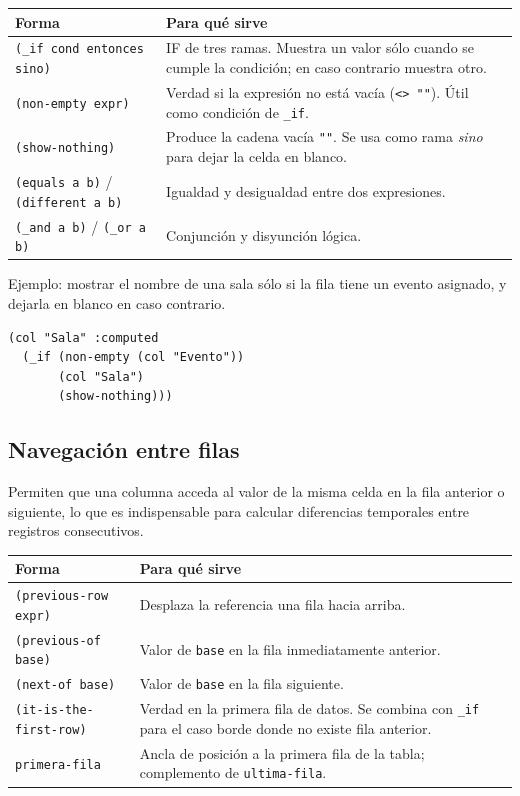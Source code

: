 \documentclass[12pt,a4paper]{report}
\begin{document}
\begin{center}
\begin{tabular}{lp{8cm}}
\toprule
\textbf{Forma} & \textbf{Para qué sirve} \\
\midrule
\texttt{(\_if cond entonces sino)} & IF de tres ramas.  Muestra un valor sólo
  cuando se cumple la condición; en caso contrario muestra otro. \\
\texttt{(non-empty expr)} & Verdad si la expresión no está vacía (\texttt{<> ""}).
  Útil como condición de \texttt{\_if}. \\
\texttt{(show-nothing)} & Produce la cadena vacía \texttt{""}.  Se usa como
  rama \emph{sino} para dejar la celda en blanco. \\
\texttt{(equals a b)} / \texttt{(different a b)} & Igualdad y desigualdad
  entre dos expresiones. \\
\texttt{(\_and a b)} / \texttt{(\_or a b)} & Conjunción y disyunción lógica. \\
\bottomrule
\end{tabular}
\end{center}

Ejemplo: mostrar el nombre de una sala sólo si la fila tiene un evento
asignado, y dejarla en blanco en caso contrario.

\begin{lstlisting}
(col "Sala" :computed
  (_if (non-empty (col "Evento"))
       (col "Sala")
       (show-nothing)))
\end{lstlisting}

\subsection*{Navegación entre filas}

Permiten que una columna acceda al valor de la misma celda en la fila
anterior o siguiente, lo que es indispensable para calcular diferencias
temporales entre registros consecutivos.

\begin{center}
\begin{tabular}{lp{8cm}}
\toprule
\textbf{Forma} & \textbf{Para qué sirve} \\
\midrule
\texttt{(previous-row expr)} & Desplaza la referencia una fila hacia arriba. \\
\texttt{(previous-of base)} & Valor de \texttt{base} en la fila inmediatamente
  anterior. \\
\texttt{(next-of base)} & Valor de \texttt{base} en la fila siguiente. \\
\texttt{(it-is-the-first-row)} & Verdad en la primera fila de datos.  Se
  combina con \texttt{\_if} para el caso borde donde no existe fila anterior. \\
\texttt{primera-fila} & Ancla de posición a la primera fila de la tabla;
  complemento de \texttt{ultima-fila}. \\
\bottomrule
\end{tabular}
\end{center}
\end{document}
